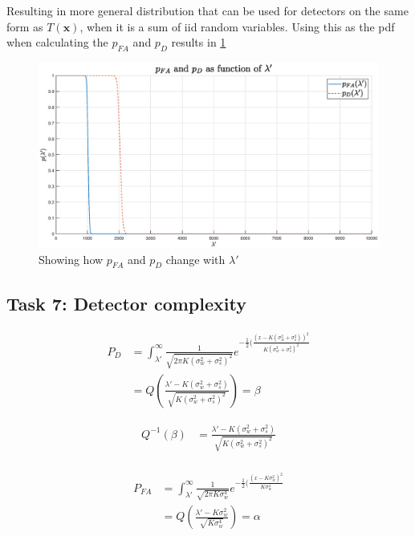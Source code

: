 Resulting in more general distribution that can be used for detectors on the same form as $T(\mathbf{x})$, when it is a sum of iid random variables. Using this as the pdf when calculating the $p_{FA}$ and $p_D$ results in \ref{fig:pfavspdaslambda}
\begin{figure}
    \centering
    \includegraphics[width=\textwidth]{figures/gauss_lambda_pfa_pd.eps}
    \caption{Showing how $p_{FA}$ and $p_D$ change with $\lambda'$}
    \label{fig:pfavspdaslambda}
\end{figure}




\subsection{Task 7: Detector complexity}

\begin{align}
    P_{D} & = 
    \int_{\lambda'}^{\infty}\frac{1}{\sqrt{2\pi K(\sigma_w^2+\sigma_s^2)^2}}e^{-\frac{1}{2}(\frac{(x-K(\sigma_w^2+\sigma_s^2))^2}{K(\sigma_w^2+\sigma_s^2)^2}}\nonumber\\
    & = Q(\frac{\lambda'-K(\sigma_w^2+\sigma_s^2)}{\sqrt{K(\sigma_w^2+\sigma_s^2)^2}})
    = \beta
\end{align}

\begin{align}
    Q^{-1}(\beta) & = \frac{\lambda'-K(\sigma_w^2+\sigma_s^2)}{\sqrt{K(\sigma_w^2+\sigma_s^2)^2}} \\
\end{align}


\begin{align}
    P_{FA} & = 
    \int_{\lambda'}^{\infty}\frac{1}{\sqrt{2\pi K\sigma_w^4}}e^{-\frac{1}{2}(\frac{(x-K\sigma_w^2)^2}{K\sigma_w^4}}\nonumber\\
    & = Q(\frac{\lambda'-K\sigma_w^2}{\sqrt{K\sigma_w^4}})
    = \alpha
\end{align}


